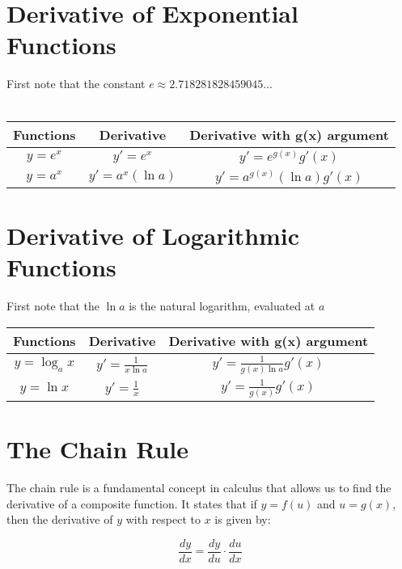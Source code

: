 \section{Derivative of Exponential Functions}
\noindent First note that the constant $e \approx 2.718281828459045...$\\\\

\begin{center}
\begin{tabular}{|c|c|c|}
  \hline
  \textbf{Functions} & \textbf{Derivative} & \textbf{Derivative with g(x) 
  argument} \\
  \hline
  $y = e^x$ & $y'=e^x$ & $y' = e^{g(x)}g'(x)$ \\
  \hline
  $y = a^x$ & $y'=a^x(\ln a)$ & $y'=a^{g(x)}(\ln a)g'(x)$\\
  \hline
\end{tabular}
\end{center}


\section{Derivative of Logarithmic Functions}
\noindent First note that the $\ln a$ is the natural logarithm, evaluated at $a$

\begin{center}
\begin{tabular}{|c|c|c|}
  \hline
  \textbf{Functions} & \textbf{Derivative} & \textbf{Derivative with g(x) 
  argument} \\
  \hline
  $y = \log_ax$ & $y'= \frac{1}{x \ln a}$ & $y' = \frac{1}{g(x)\ln a} g'(x)$ \\
  \hline
  $y = \ln x$ & $y'= \frac{1}{x}$ & $y'= \frac{1}{g(x)} g'(x)$\\
  \hline
\end{tabular}
\end{center}


\section{The Chain Rule}

The chain rule is a fundamental concept in calculus that allows us to find the 
derivative of a composite function. It states that if $y = f(u)$ and $u = g(x)$, 
then the derivative of $y$ with respect to $x$ is given by:

\begin{equation}
\frac{dy}{dx} = \frac{dy}{du} \cdot \frac{du}{dx}
\end{equation}

